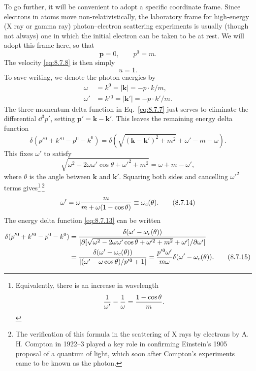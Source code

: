 To go further, it will be convenient to adopt a specific coordinate frame.
Since electrons in atoms move non-relativistically, the laboratory frame for
high-energy (X ray or gamma ray) photon--electron scattering experiments is
usually (though not always) one in which the initial electron can be taken to
be at rest. We will adopt this frame here, so that
\begin{equation}
\mathbf p=0,\qquad p^0=m.
\tag{8.7.9}\label{eq:8.7.9}
\end{equation}
The velocity \eqref{eq:8.7.8} is then simply
\begin{equation}
u=1.
\tag{8.7.10}\label{eq:8.7.10}
\end{equation}
To save writing, we denote the photon energies by
\begin{align}
\omega&=k^0=|\mathbf k|=-p\cdot k/m,
\tag{8.7.11}\label{eq:8.7.11}\\
\omega'&=k'{}^0=|\mathbf k'|=-p\cdot k'/m.
\tag{8.7.12}\label{eq:8.7.12}
\end{align}
The three-momentum delta function in Eq.~\eqref{eq:8.7.7} just serves to eliminate
the differential $\dd^3p'$, setting $\mathbf p'=\mathbf k-\mathbf k'$. This
leaves the remaining energy delta function
\begin{equation}
\delta(p'{}^0+k'{}^0-p^0-k^0)
=\delta\!\left(\sqrt{(\mathbf k-\mathbf k')^2+m^2}+\omega'-m-\omega\right).
\tag{8.7.13}\label{eq:8.7.13}
\end{equation}
This fixes $\omega'$ to satisfy
\[
\sqrt{\omega^2-2\omega\omega'\cos\theta+\omega'^2+m^2}
=\omega+m-\omega',
\]
where $\theta$ is the angle between $\mathbf k$ and $\mathbf k'$. Squaring
both sides and cancelling $\omega'^2$ terms gives\footnote{Equivalently,
there is an increase in wavelength
\[
{1\over\omega'}-{1\over\omega}={1-\cos\theta\over m}.
\]}\,\footnote{The verification of this formula in the scattering of X rays by
electrons by A. H. Compton in 1922--3 played a key role in confirming
Einstein's 1905 proposal of a quantum of light, which soon after Compton's
experiments came to be known as the photon.}
\begin{equation}
\omega'=\omega{m\over m+\omega(1-\cos\theta)}\equiv\omega_c(\theta).
\tag{8.7.14}\label{eq:8.7.14}
\end{equation}
The energy delta function \eqref{eq:8.7.13} can be written
\begin{align}
\delta(p'{}^0+k'{}^0-p^0-k^0)
&={\delta(\omega'-\omega_c(\theta))\over
 |\partial[\sqrt{\omega^2-2\omega\omega'\cos\theta+\omega'^2+m^2}
        +\omega']/\partial\omega'|}
\notag\\
&={\delta(\omega'-\omega_c(\theta))\over
 |(\omega'-\omega\cos\theta)/p'{}^0+1|}
={p'{}^0\omega'\over m\omega}\delta(\omega'-\omega_c(\theta)).
\tag{8.7.15}\label{eq:8.7.15}
\end{align}
